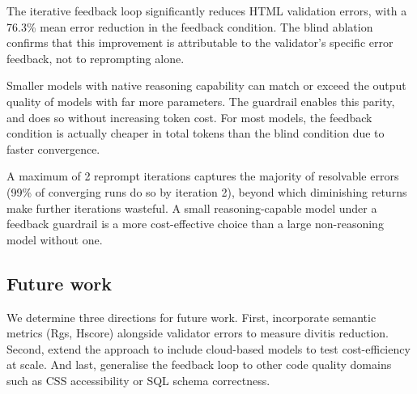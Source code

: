 

The iterative feedback loop significantly reduces HTML validation errors, with a 76.3\% mean error reduction in the feedback condition. The blind ablation confirms that this improvement is attributable to the validator's specific error feedback, not to reprompting alone.

Smaller models with native reasoning capability can match or exceed the output quality of models with far more parameters. The guardrail enables this parity, and does so without increasing token cost. For most models, the feedback condition is actually cheaper in total tokens than the blind condition due to faster convergence.

A maximum of 2 reprompt iterations captures the majority of resolvable errors (99\% of converging runs do so by iteration 2), beyond which diminishing returns make further iterations wasteful. A small reasoning-capable model under a feedback guardrail is a more cost-effective choice than a large non-reasoning model without one.

\subsection{Future work}

We determine three directions for future work. First, incorporate semantic metrics (Rgs, Hscore) alongside validator errors to measure divitis reduction. Second, extend the approach to include cloud-based models to test cost-efficiency at scale. And last, generalise the feedback loop to other code quality domains such as CSS accessibility or SQL schema correctness.